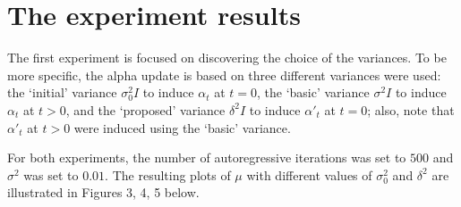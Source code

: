 \documentclass[12pt]{article}
\begin{document}
\section*{The experiment results}

\par The first experiment is focused on discovering the choice of the variances. To be more specific, the alpha update is based on three different variances were used: the `initial' variance $\sigma^2_0I$ to induce $\alpha_t$ at $t=0$, the `basic' variance $\sigma^2I$ to induce $\alpha_t$ at $t>0$, and the `proposed' variance $\delta^2I$ to induce $\alpha'_t$ at $t=0$; also, note that $\alpha'_t$ at $t>0$ were induced using the `basic' variance.

\par For both experiments, the number of autoregressive iterations was set to $500$ and $\sigma^2$ was set to $0.01$. The resulting plots of $\mu$ with different values of $\sigma^2_0$ and $\delta^2$ are illustrated in Figures 3, 4, 5 below.
\end{document}
